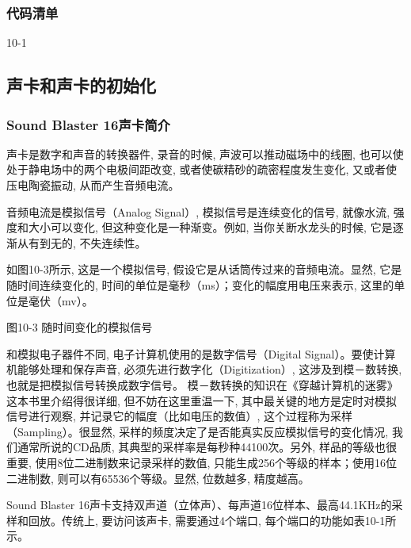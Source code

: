\documentclass[12pt]{article}
\begin{document}
\begin{CJK}{UTF8}{gbsn}
\subsubsection{代码清单}
%
%

10-1
%

\subsection{声卡和声卡的初始化}
\subsubsection{Sound Blaster 16声卡简介}
声卡是数字和声音的转换器件, 录音的时候, 声波可以推动磁场中的线圈, 也可以使处于静电场中的两个电极间距改变, 或者使碳精砂的疏密程度发生变化, 又或者使压电陶瓷振动, 从而产生音频电流。

音频电流是模拟信号（Analog Signal）, 模拟信号是连续变化的信号, 就像水流, 强度和大小可以变化, 但这种变化是一种渐变。例如, 当你关断水龙头的时候, 它是逐渐从有到无的, 不失连续性。

如图10-3所示, 这是一个模拟信号, 假设它是从话筒传过来的音频电流。显然, 它是随时间连续变化的, 时间的单位是毫秒（ms）；变化的幅度用电压来表示, 这里的单位是毫伏（mv）。
 
图10-3  随时间变化的模拟信号

和模拟电子器件不同, 电子计算机使用的是数字信号（Digital Signal）。要使计算机能够处理和保存声音, 必须先进行数字化（Digitization）, 这涉及到模－数转换, 也就是把模拟信号转换成数字信号。
模－数转换的知识在《穿越计算机的迷雾》这本书里介绍得很详细, 但不妨在这里重温一下, 其中最关键的地方是定时对模拟信号进行观察, 并记录它的幅度（比如电压的数值）, 这个过程称为采样（Sampling）。很显然, 采样的频度决定了是否能真实反应模拟信号的变化情况, 我们通常所说的CD品质, 其典型的采样率是每秒种44100次。另外, 样品的等级也很重要, 使用8位二进制数来记录采样的数值, 只能生成256个等级的样本；使用16位二进制数, 则可以有65536个等级。显然, 位数越多, 精度越高。

Sound Blaster 16声卡支持双声道（立体声）、每声道16位样本、最高44.1KHz的采样和回放。传统上, 要访问该声卡, 需要通过4个端口, 每个端口的功能如表10-1所示。


\end{CJK}
\end{document}
